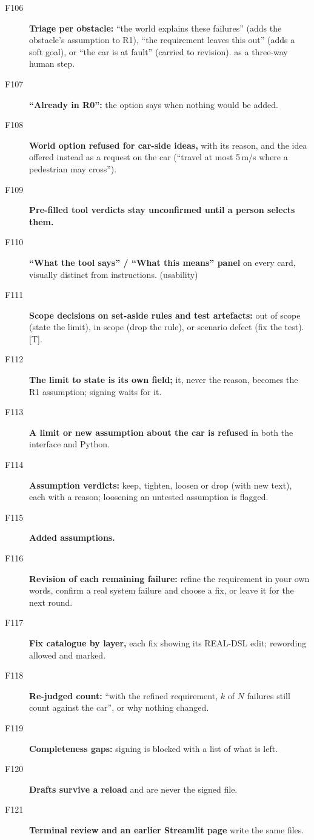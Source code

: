 \begin{description}
\item[F106] \textbf{Triage per obstacle:} ``the world explains these failures'' (adds the obstacle's assumption to R1), ``the requirement leaves this out'' (adds a soft goal), or ``the car is at fault'' (carried to revision).  \tagnew{} as a three-way human step.
\item[F107] \textbf{``Already in R0'':} the option says when nothing would be added. \tagnew{}
\item[F108] \textbf{World option refused for car-side ideas,} with its reason, and the idea offered instead as a request on the car (``travel at most 5\,m/s where a pedestrian may cross''). \tagnew{}
\item[F109] \textbf{Pre-filled tool verdicts stay unconfirmed until a person selects them.} \tagnew{}
\item[F110] \textbf{``What the tool says'' / ``What this means'' panel} on every card, visually distinct from instructions. \tagnew{} (usability)
\item[F111] \textbf{Scope decisions on set-aside rules and test artefacts:} out of scope (state the limit), in scope (drop the rule), or scenario defect (fix the test).  \tagnew{} [T].
\item[F112] \textbf{The limit to state is its own field;} it, never the reason, becomes the R1 assumption; signing waits for it. \tagnew{}
\item[F113] \textbf{A limit or new assumption about the car is refused} in both the interface and Python. \tagnew{}
\item[F114] \textbf{Assumption verdicts:} keep, tighten, loosen or drop (with new text), each with a reason; loosening an untested assumption is flagged. 
\item[F115] \textbf{Added assumptions.} 
\item[F116] \textbf{Revision of each remaining failure:} refine the requirement in your own words, confirm a real system failure and choose a fix, or leave it for the next round. \tagnew{}
\item[F117] \textbf{Fix catalogue by layer,} each fix showing its REAL-DSL edit; rewording allowed and marked. 
\item[F118] \textbf{Re-judged count:} ``with the refined requirement, $k$ of $N$ failures still count against the car'', or why nothing changed. \tagnew{}
\item[F119] \textbf{Completeness gaps:} signing is blocked with a list of what is left. \tagnew{}
\item[F120] \textbf{Drafts survive a reload} and are never the signed file. \taginfra
\item[F121] \textbf{Terminal review and an earlier Streamlit page} write the same files. \taginfra
\end{description}

